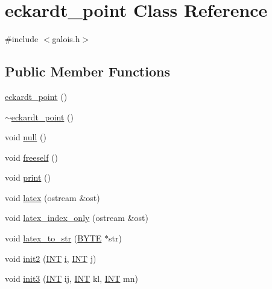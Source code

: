 \hypertarget{classeckardt__point}{}\section{eckardt\+\_\+point Class Reference}
\label{classeckardt__point}


{\ttfamily \#include $<$galois.\+h$>$}

\subsection*{Public Member Functions}
\begin{DoxyCompactItemize}
\item 
\mbox{\hyperlink{classeckardt__point_af3ff260def40b39b27c5e5805dc7c8f2}{eckardt\+\_\+point}} ()
\item 
\mbox{\hyperlink{classeckardt__point_a39d3361bd34251e51858dca913da44a1}{$\sim$eckardt\+\_\+point}} ()
\item 
void \mbox{\hyperlink{classeckardt__point_af6996611233582f1c94d5226a34c59e3}{null}} ()
\item 
void \mbox{\hyperlink{classeckardt__point_acd5976cca5869b51c9226dc9ff2376a7}{freeself}} ()
\item 
void \mbox{\hyperlink{classeckardt__point_aeb291944e3d18d5ce113c54426f62ba0}{print}} ()
\item 
void \mbox{\hyperlink{classeckardt__point_a2aa137a6c9a1ed28d410f63858f42ccf}{latex}} (ostream \&ost)
\item 
void \mbox{\hyperlink{classeckardt__point_af8fdbe7105921bd80a717cbdaae00e87}{latex\+\_\+index\+\_\+only}} (ostream \&ost)
\item 
void \mbox{\hyperlink{classeckardt__point_a1c2ba0333f556cc0db508691c77ec614}{latex\+\_\+to\+\_\+str}} (\mbox{\hyperlink{galois_8h_ab6cc7b4aeb6ea31aba2b3fbfc83ff5e6}{B\+Y\+TE}} $\ast$str)
\item 
void \mbox{\hyperlink{classeckardt__point_a3ebf69b5c9ce60d4c8371ebe384bfb81}{init2}} (\mbox{\hyperlink{galois_8h_a09fddde158a3a20bd2dcadb609de11dc}{I\+NT}} \mbox{\hyperlink{alphabet2_8_c_acb559820d9ca11295b4500f179ef6392}{i}}, \mbox{\hyperlink{galois_8h_a09fddde158a3a20bd2dcadb609de11dc}{I\+NT}} \mbox{\hyperlink{alphabet2_8_c_a37d972ae0b47b9099e30983131d31916}{j}})
\item 
void \mbox{\hyperlink{classeckardt__point_a44c0c0594e27651063031c618cc63343}{init3}} (\mbox{\hyperlink{galois_8h_a09fddde158a3a20bd2dcadb609de11dc}{I\+NT}} ij, \mbox{\hyperlink{galois_8h_a09fddde158a3a20bd2dcadb609de11dc}{I\+NT}} kl, \mbox{\hyperlink{galois_8h_a09fddde158a3a20bd2dcadb609de11dc}{I\+NT}} mn)

\end{DoxyCompactItemize}
